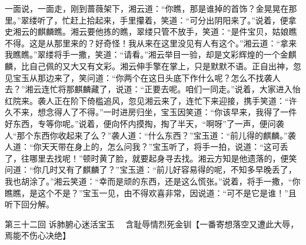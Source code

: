 \documentclass[12pt,oneside]{book}
\begin{document}
一面说，一面走，刚到蔷薇架下，湘云道：“你瞧，那是谁掉的首饰？金晃晃在那里。”翠缕听了，忙赶上拾起来，手里攥着，笑道：“可分出阴阳来了。”说着，便拿史湘云的麒麟瞧。湘云要他拣的瞧，翠缕只管不放手，笑道：“是件宝贝，姑娘瞧不得。这是从那里来的？好奇怪！我从来在这里没见有人有这个。”湘云道：“拿来我瞧瞧。”翠缕将手一撒，笑道：“请看。”湘云举目一验，却是文彩辉煌的一个金麒麟，比自己佩的又大又有文彩。湘云伸手擎在掌上，只是默默不语。正自出神，忽见宝玉从那边来了，笑问道：“你两个在这日头底下作什么呢？怎么不找袭人去？”湘云连忙将那麒麟藏了，说道：“正要去呢。咱们一同走。”说着，大家进入怡红院来。袭人正在阶下倚槛追风，忽见湘云来了，连忙下来迎接，携手笑道：“许久不来，想念得人了不得。”一时进房归坐，宝玉因笑道：“你该早来，我得了一件好东西，专等你呢。”说着，便向怀内摸掏，掏了半天，“啊呀”了一声，便问袭人“那个东西你收起来了么？”袭人道：“什么东西？”宝玉道：“前儿得的麒麟。”袭人道：“你天天带在身上的，怎么问我？”宝玉听了，将手一拍，说道：“这可丢了，往哪里去找呢！”顿时黄了脸，就要起身寻去找。湘云方知是他遗落的，便笑问道：“你几时又有了麒麟了？”宝玉道：“前儿好容易得的呢，不知多早晚丢了，我也胡涂了。”湘云笑道：“幸而是顽的东西，还是这么慌张。”说着，将手一撒，“你瞧瞧，是这个不是？”宝玉一见，由不得欢喜非常，因说道：“可不是它是谁！”且听下回分解。
 
第三十二回  诉肺腑心迷活宝玉　
      含耻辱情烈死金钏【一番寄想落空又遭此大辱，焉能不伤心决绝】
\end{document}
